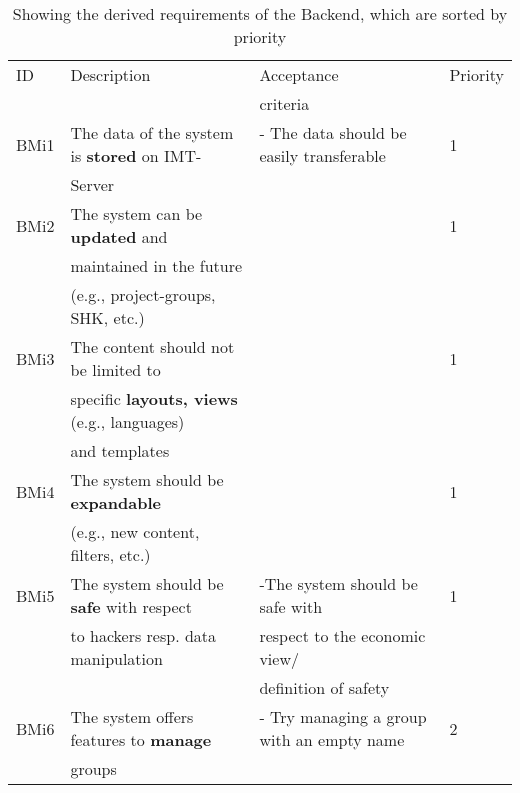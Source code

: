 \documentclass[twoside,openright,fleqn,pointlessnumbers,headinclude,,11pt,a4paper,BCOR5mm,footinclude,cleardoubleempty,abstracton %
                ]{scrreprt}
\begin{document}
	\begin{table}[h]
			\caption{Showing the derived requirements of the Backend, which are sorted by priority}
	\centering%
	\begin{tabular}{llll}
			\hline
	ID 	& Description 	& Acceptance 	& Priority \\
	 	& 			 & criteria 	&  \\
	\hline
	BMi1 & The data of the system is \textbf{stored} on IMT- 	& - The data should be easily transferable & 1	\\
	 	& Server										&  & 		\\
	\hline
	BMi2 & The system can be \textbf{updated} and  			&  & 1	\\
	 	& maintained in the future						&  & 	\\
		& (e.g., project-groups, SHK, etc.)					& 	& \\
	\hline
	BMi3 & The content should not be limited to				&  	& 1\\
	 	& specific \textbf{layouts, views} (e.g., languages)		&	& \\
		& and templates 								&  	& \\
		\hline
	BMi4 & The system should be \textbf{expandable} 		&  	& 1	\\
	 	& (e.g., new content, filters, etc.)					&  	& 		\\
	\hline
	BMi5 & The system should be \textbf{safe} with respect 	& -The system should be safe with 	& 1	\\
	 	& to hackers resp. data manipulation 				&  respect to the economic view/ 	& 	\\
		&											& definition of safety			&\\
	\hline
	BMi6 & The system offers features to \textbf{manage}  		& - Try managing a group with an empty name  & 2\\
	 	& groups 										&  & \\
			\hline
	\end{tabular}

	\label{RequirementsBackendMisc}
	\end{table}
\end{document}
